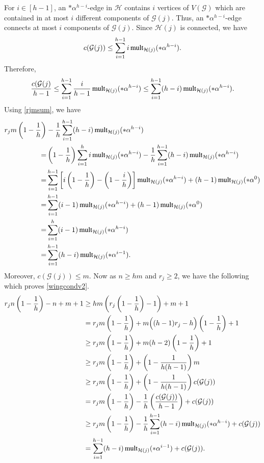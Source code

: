 \documentclass[12pt,oneside]{amsart}
\newcommand\mult{\operatorname{\textup{{\fontfamily{ptm}\selectfont mult}}}}
\newcommand{\cc}{\mathcal}
\begin{document}
For $i\in[h-1]$, an $*\alpha^{h-i}$-edge in $\cc H$ contains $i$ vertices of $V(\cc G)$ which are contained in at most $i$ different components of $\cc G(j)$. Thus, an $*\alpha^{h-i}$-edge connects at most $i$ components of $\cc G(j)$. Since $\cc H(j)$ is connected, we have
\begin{equation*}
c(\cc G(j)) \leq \sum_{i=1}^{h-1}i\mult_{\cc H(j)}(* \alpha^{h-i}). 
\end{equation*}
Therefore,
\begin{equation} \label{components}
\frac{c(\cc G(j)}{h-1} \leq \sum_{i=1}^{h-1}\frac{i}{h-1}\mult_{\cc H(j)}(*\alpha^{h-i}) \leq \sum_{i=1}^{h-1}(h-i)\mult_{\cc H(j)}(*\alpha^{h-i}).
\end{equation}
Using \eqref{rjmsum}, we have
\begin{align} \label{rmlong}
    r_jm \left ( 1- \frac{1}{h}\right)& - \frac{1}{h}\sum_{i=1}^{h-1}(h-i)\mult_{\cc H(j)}(*\alpha^{h-i}) \nonumber\\
    =&  \left ( 1- \frac{1}{h}\right)\sum_{i=1}^{h}i\mult_{\cc H(j)}(*\alpha^{h-i}) - \frac{1}{h}\sum_{i=1}^{h-1}(h-i)\mult_{\cc H(j)}(*\alpha^{h-i}) \nonumber\\
    =& \sum_{i=1}^{h-1} \left[i\left ( 1- \frac{1}{h}\right)-\left(1-\frac{i}{h}\right)\right]\mult_{\cc H(j)}(*\alpha^{h-i}) + (h-1)\mult_{\cc H(j)}(*\alpha^{0})\nonumber\\
    =& \sum_{i=1}^{h-1} (i-1)\mult_{\cc H(j)}(*\alpha^{h-i}) + (h-1)\mult_{\cc H(j)}(*\alpha^{0})\nonumber\\
    =& \sum_{i=1}^h (i-1)\mult_{\cc H(j)}(*\alpha^{h-i})\nonumber\\
    =& \sum_{i=1}^{h-1} (h-i)\mult_{\cc H(j)}(*\alpha^{i-1}).
    \end{align}
Moreover, $c(\cc G(j))\leq m$. Now as $n\geq hm$ and  $r_j\geq 2$, we have the following which proves \eqref{wingcondv2}. 
\begin{align*}
    r_jn \left ( 1- \frac{1}{h}\right) - n + m + 1 &\geq hm\left(r_j \left ( 1- \frac{1}{h}\right) - 1\right) + m + 1\\
    &= r_jm \left ( 1- \frac{1}{h}\right) + m\Big ((h-1)r_j - h\Big)\left ( 1- \frac{1}{h}\right) + 1\\
    &\geq r_jm \left ( 1- \frac{1}{h}\right) +m(h-2)\left ( 1- \frac{1}{h}\right) + 1\\
    &\geq r_jm \left ( 1- \frac{1}{h}\right) + \left ( 1- \frac{1}{h(h-1)}\right)m\\
    &\geq r_jm \left ( 1- \frac{1}{h}\right) + \left ( 1- \frac{1}{h(h-1)}\right)c(\cc G(j))\\
    &= r_jm \left ( 1- \frac{1}{h}\right)  - \frac{1}{h}\left(\frac{c(\cc G(j))}{h-1}\right)+c(\cc G(j))\\
    &\geq r_jm \left ( 1- \frac{1}{h}\right) - \frac{1}{h}\sum_{i=1}^{h-1}(h-i)\mult_{\cc H(j)}(*\alpha^{h-i}) + c(\cc G(j))\\
    &= \sum_{i=1}^{h-1}(h-i)\mult_{\cc H(j)}(*\alpha^{i-1}) + c(\cc G(j)).
\end{align*}
\end{document}
